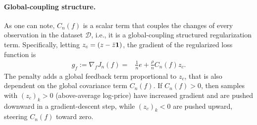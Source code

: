 \documentclass[11pt]{article}
\theoremstyle{plain}
\theoremstyle{definition}
\newcommand{\1}{\mathbf{1}}
\newcommand{\D}{\mathcal{D}}
\renewcommand{\t}{^{\top}}
\begin{document}
\paragraph{Global-coupling structure.}
%
%
As one can note, $C_n(f)$ is a scalar term that couples the changes of every observation in the dataset $\D$, i.e., it is a global-coupling structured regularization term. Specifically, letting $z_c = (z - \Bar{z}\textbf{1})$, the gradient of the regularized loss function is 
\begin{align}
\label{def:loss_gradient}
g_f:=\nabla_f J_n(f) =& \frac{1}{n}  e + \frac{\rho}{n}   C_n(f)   z_c.
\end{align}
The penalty adds a global feedback term proportional to \(z_c\), that is also dependent on the global covariance term $C_n(f)$. If \(C_n(f)>0\), then samples with \((z_{c})_k>0\) (above-average log-price) have increased gradient and are pushed downward in a gradient-descent step, while \((z_{c})_k<0\) are pushed upward, steering \(C_n(f)\) toward zero. 
\end{document}
